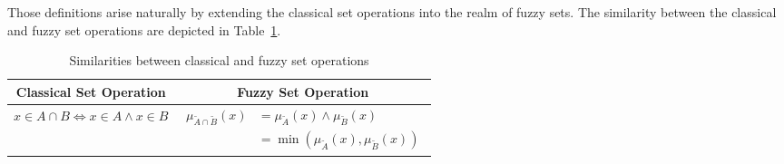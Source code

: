 Those definitions arise naturally by extending the classical set operations into the realm of fuzzy sets. The similarity between the classical and fuzzy set operations are depicted in Table~\ref{tab:fuzzy_logic_operations}.

\begin{table}
      \centering
      \begin{tabular}{|c|c|}
            \hline
            Classical Set Operation                                & Fuzzy Set Operation                                                                            \\
            \hline
            $x \in A \cap B \iff x \in A \land x \in B$            &
            \parbox{6cm}{    \begin{align*}
                                         \mu_{\tilde{A} \cap \tilde{B}}(x) & = \mu_{\tilde{A}}(x) \land \mu_{\tilde{B}}(x)  \\
                                                                           & = \min(\mu_{\tilde{A}}(x), \mu_{\tilde{B}}(x))
                                   \end{align*}} \\
            \hline
            $x \in A \cup B \iff x \in A \lor x \in B$             &
            \parbox{6cm}{    \begin{align*}
                                         \mu_{{\tilde{A} \cup  \tilde{B}}}(x) & = \mu_{\tilde{A}}(x) \lor \mu_{\tilde{B}}(x)   \\
                                                                              & = \max(\mu_{\tilde{A}}(x), \mu_{\tilde{B}}(x))
                                   \end{align*}}           \\
            \hline
            $x \in \bar{A} \iff x \notin A  \iff \neg ({x \in A})$ &
            \parbox{6cm}{    \begin{align*}
                                         \mu_{\neg \tilde{A}}(x) & = \neg \mu_{\tilde{A}}(x) \\
                                                                 & = 1 - \mu_{\tilde{A}}(x)
                                   \end{align*}}                                                        \\
            \hline
      \end{tabular}
      \caption{Similarities between classical and fuzzy set operations}
      \label{tab:fuzzy_logic_operations}
\end{table}

